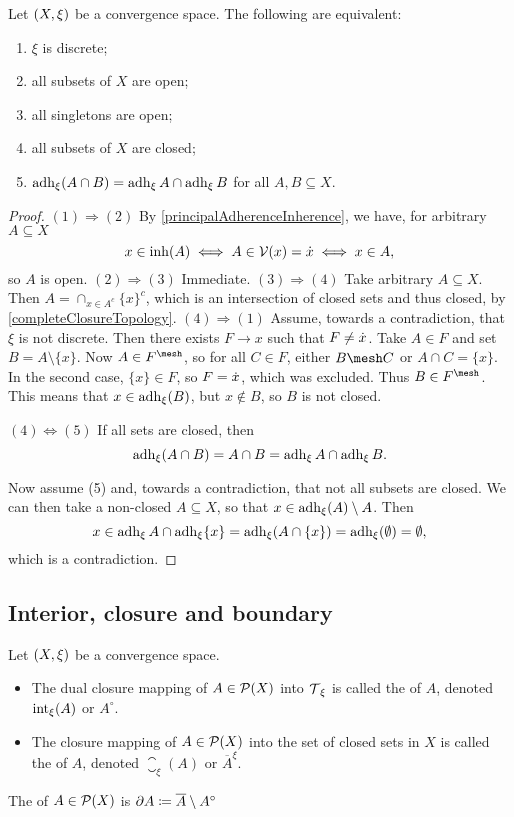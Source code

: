 \begin{proposition} \label{discreteTopologyCharacterisation}
Let $\left( X,\xi \right)$ be a convergence space. The following are equivalent:
\begin{enumerate}
\item $\xi$ is discrete;
\item all subsets of $X$ are open;
\item all singletons are open;
\item all subsets of $X$ are closed;
\item $\operatorname{adh}_\xi(A\cap B) = \operatorname{adh}_\xi A \cap \operatorname{adh}_\xi B$ for all $A,B\subseteq X$.
\end{enumerate}
\end{proposition}
\begin{proof}
$(1) \Rightarrow (2)$ By \ref{principalAdherenceInherence}, we have, for arbitrary $A\subseteq X$
\[ x\in \operatorname{inh}(A) \iff A\in \operatorname{\mathcal{V}}(x) = \dot{x} \iff x\in A, \]
so $A$ is open.
$(2) \Rightarrow (3)$ Immediate.
$(3) \Rightarrow (4)$ Take arbitrary $A\subseteq X$. Then $A = \cap_{x\in A^c}\{x\}^c$, which is an intersection of closed sets and thus closed, by \ref{completeClosureTopology}.
$(4) \Rightarrow (1)$ Assume, towards a contradiction, that $\xi$ is not discrete. Then there exists $F\to x$ such that $F \neq \dot{x}$. Take $A\in F$ and set $B = A\setminus\{x\}$. Now $A\in F^\mesh$, so for all $C\in F$, either $B\mesh C$ or $A\cap C = \{x\}$. In the second case, $\{x\}\in F$, so $F = \dot{x}$, which was excluded. Thus $B\in F^\mesh$. This means that $x\in \operatorname{adh}_\xi(B)$, but $x\notin B$, so $B$ is not closed. 

$(4) \Leftrightarrow (5)$ If all sets are closed, then
\[ \operatorname{adh}_\xi(A\cap B) = A\cap B = \operatorname{adh}_\xi A \cap \operatorname{adh}_\xi B. \]

Now assume (5) and, towards a contradiction, that not all subsets are closed. We can then take a non-closed $A\subseteq X$, so that $x\in \operatorname{adh}_\xi(A)\setminus A$. Then
\[ x\in \operatorname{adh}_\xi A \cap \operatorname{adh}_\xi \{x\} = \operatorname{adh}_\xi(A\cap\{x\}) = \operatorname{adh}_\xi(\emptyset) = \emptyset, \]
which is a contradiction.
\end{proof}

\subsection{Interior, closure and boundary}
\begin{definition}
Let $\left( X,\xi \right)$ be a convergence space.
\begin{itemize}
\item The dual closure mapping of $A\in \operatorname{\mathcal{P}}(X)$ into $\operatorname{\mathcal{T}}_\xi$ is called the  of $A$, denoted $\operatorname{int}_\xi(A)$ or $A^\circ$. 
\item The closure mapping of $A\in \operatorname{\mathcal{P}}(X)$ into the set of closed sets in $X$ is called the  of $A$, denoted $\closure_\xi(A)$ or $\overline{A}^\xi$. 
\end{itemize}
The  of $A\in\operatorname{\mathcal{P}}(X)$ is $\partial A \coloneqq \overline{A}\setminus A^{\circ}$
\end{definition}

